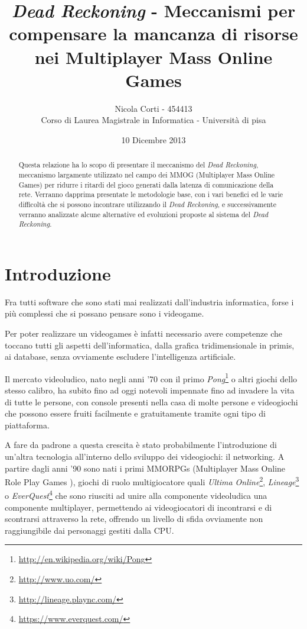 \documentclass[a4paper,11pt]{article}
\title{\emph{Dead Reckoning} - Meccanismi per compensare la mancanza di risorse nei Multiplayer Mass Online Games}
\author{Nicola Corti - 454413 \\Corso di Laurea Magistrale in Informatica - Universit\`a di pisa}
\date{10 Dicembre 2013}
\begin{document}
\maketitle
 
\begin{abstract}
Questa relazione ha lo scopo di presentare il meccanismo del \emph{Dead Reckoning}, meccanismo largamente utilizzato nel campo dei MMOG (Multiplayer Mass Online Games) per ridurre i ritardi del gioco generati dalla latenza di comunicazione della rete. Verranno dapprima presentate le metodologie base, con i vari benefici ed le varie difficolt\`a che si possono incontrare utilizzando il \emph{Dead Reckoning}, e successivamente verranno analizzate alcune alternative ed evoluzioni proposte al sistema del \emph{Dead Reckoning}.
\end{abstract}

\tableofcontents

\section*{Introduzione}

Fra tutti software che sono stati mai realizzati dall'industria informatica, forse i pi\`u complessi che si possano pensare sono i videogame.

Per poter realizzare un videogames \`e infatti necessario avere competenze che toccano tutti gli aspetti dell'informatica, dalla grafica tridimensionale in primis, ai database, senza ovviamente escludere l'intelligenza artificiale.

Il mercato videoludico, nato negli anni '70 con il primo \emph{Pong}\footnote{\url{http://en.wikipedia.org/wiki/Pong}} o altri giochi dello stesso calibro, ha subito fino ad oggi notevoli impennate fino ad invadere la vita di tutte le persone, con console presenti nella casa di molte persone e videogiochi che possono essere fruiti facilmente e gratuitamente tramite ogni tipo di piattaforma.

A fare da padrone a questa crescita \`e stato probabilmente l'introduzione di un'altra tecnologia all'interno dello sviluppo dei videogiochi: il networking. A partire dagli anni '90 sono nati i primi MMORPGs (Multiplayer Mass Online Role Play Games \cite{wiki1}), giochi di ruolo multigiocatore quali \emph{Ultima Online}\footnote{\url{http://www.uo.com/}}, \emph{Lineage}\footnote{\url{http://lineage.plaync.com/}} o \emph{EverQuest}\footnote{\url{https://www.everquest.com/}} che sono riusciti ad unire alla componente videoludica una componente multiplayer, permettendo ai videogiocatori di incontrarsi e di scontrarsi attraverso la rete, offrendo un livello di sfida ovviamente non raggiungibile dai personaggi gestiti dalla CPU.
\end{document}
